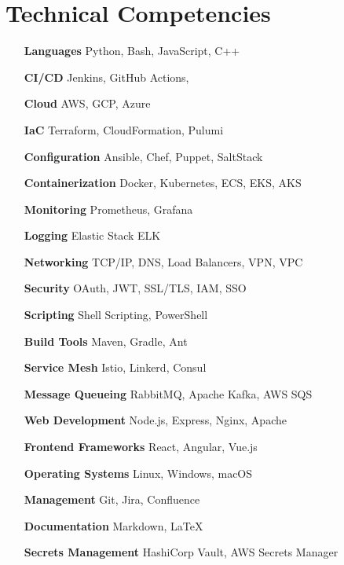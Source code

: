 \section{Technical Competencies}

\begin{multicols}{2}
    \begin{itemize}[itemsep=-2px, parsep=1pt, leftmargin=75pt]
        \item[\textbf{Languages}] Python, Bash, JavaScript, C++
        \item[\textbf{CI/CD}] Jenkins, GitHub Actions,
        \item[\textbf{Cloud}] AWS, GCP, Azure
        \item[\textbf{IaC}] Terraform, CloudFormation, Pulumi
        \item[\textbf{Configuration}] Ansible, Chef, Puppet, SaltStack
        \item[\textbf{Containerization}] Docker, Kubernetes, ECS, EKS, AKS
        \item[\textbf{Monitoring}] Prometheus, Grafana
        \item[\textbf{Logging}] Elastic Stack ELK
        \item[\textbf{Networking}] TCP/IP, DNS, Load Balancers, VPN, VPC
        \item[\textbf{Security}] OAuth, JWT, SSL/TLS, IAM, SSO
        \item[\textbf{Scripting}] Shell Scripting, PowerShell
        \item[\textbf{Build Tools}] Maven, Gradle, Ant
        \item[\textbf{Service Mesh}] Istio, Linkerd, Consul
        \item[\textbf{Message Queueing}] RabbitMQ, Apache Kafka, AWS SQS
        \item[\textbf{Web Development}] Node.js, Express, Nginx, Apache
        \item[\textbf{Frontend Frameworks}] React, Angular, Vue.js
        \item[\textbf{Operating Systems}] Linux, Windows, macOS
        \item[\textbf{Management}] Git, Jira, Confluence
        \item[\textbf{Documentation}] Markdown, LaTeX
        \item[\textbf{Secrets Management}] HashiCorp Vault, AWS Secrets Manager
    \end{itemize}
\end{multicols}
